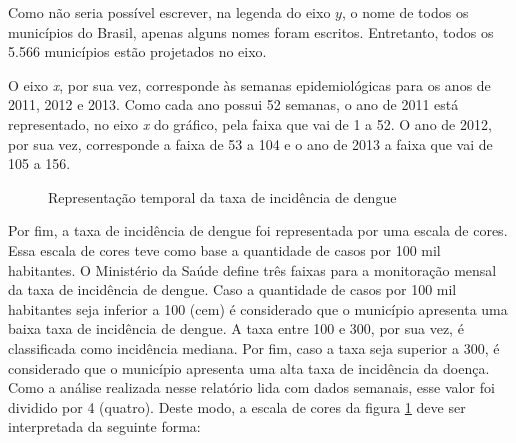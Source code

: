 \documentclass[12pt,openright,twoside,a4paper,article,brazil]{abntex2}
\begin{document}
Como não seria possível escrever, na legenda do eixo $y$, o nome de todos os municípios do Brasil, apenas alguns nomes foram escritos. Entretanto, todos os 5.566 municípios estão projetados no eixo.

O eixo \emph{x}, por sua vez, corresponde às semanas epidemiológicas para os anos de 2011, 2012 e 2013. Como cada ano possui 52 semanas, o ano de 2011 está representado, no eixo \emph{x} do gráfico, pela faixa que vai de 1 a 52. O ano de 2012, por sua vez, corresponde a faixa de 53 a 104 e o ano de 2013 a faixa que vai de 105 a 156.

\begin{figure}[h]
	\centering
	\caption{Representação temporal da taxa de incidência de dengue}
	\label{fig:dengue-mds}
\end{figure}

Por fim, a taxa de incidência de dengue foi representada por uma escala de cores. Essa escala de cores teve como base a quantidade de casos por 100 mil habitantes. O Ministério da Saúde define três faixas para a monitoração mensal da taxa de incidência de dengue\cite{gaussian-system-dengue}. Caso a quantidade de casos por 100 mil habitantes seja inferior a 100 (cem) é considerado que o município apresenta uma baixa taxa de incidência de dengue. A taxa entre 100 e 300, por sua vez, é classificada como incidência mediana. Por fim, caso a taxa seja superior a 300, é considerado que o município apresenta uma alta taxa de incidência da doença. Como a análise realizada nesse relatório lida com dados semanais, esse valor foi dividido por 4 (quatro). Deste modo, a escala de cores da figura \ref{fig:dengue-mds} deve ser interpretada da seguinte forma:
\end{document}
